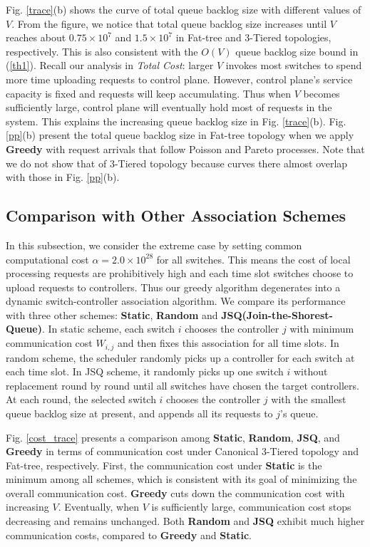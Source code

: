 \documentclass[10pt,journal,compsoc]{IEEEtran}
\begin{document}
Fig. \ref{trace}(b) shows the curve of total queue backlog size with different values of $V$. From the figure, we notice that total queue backlog size increases until $V$ reaches about $0.75 \times 10^7$ and $1.5 \times 10^7$ in Fat-tree and 3-Tiered topologies, respectively. This is also consistent with the $O(V)$ queue backlog size bound in (\ref{th1}). Recall our analysis in \emph{Total Cost}: larger $V$ invokes most switches to spend more time uploading requests to control plane. However, control plane's service capacity is fixed and requests will keep accumulating. Thus when $V$ becomes sufficiently large, control plane will eventually hold most of requests in the system. This explains the increasing queue backlog size in Fig. \ref{trace}(b). Fig. \ref{pp}(b) present the total queue backlog size in Fat-tree topology when we apply {\bf Greedy} with request arrivals that follow Poisson and Pareto processes. Note that we do not show that of 3-Tiered topology because curves there almost overlap with those in Fig. \ref{pp}(b).

\subsection{Comparison with Other Association Schemes}

In this subsection, we consider the extreme case by setting common computational cost $\alpha = 2.0 \times 10^{28}$ for all switches. This means the cost of local processing requests are prohibitively high and each time slot switches choose to upload requests to controllers. Thus our greedy algorithm degenerates into a dynamic switch-controller association algorithm. We compare its performance with three other schemes: \textbf{Static}, \textbf{Random} and \textbf{JSQ(Join-the-Shorest-Queue)}. In static scheme, each switch $i$ chooses the controller $j$ with minimum communication cost $W_{i,j}$ and then fixes this association for all time slots. In random scheme, the scheduler randomly picks up a controller for each switch at each time slot. In JSQ scheme, it randomly picks up one switch $i$ without replacement round by round until all switches have chosen the target controllers. At each round, the selected switch $i$ chooses the controller $j$ with the smallest queue backlog size at present, and appends all its requests to $j$'s queue. 

Fig. \ref{cost_trace} presents a comparison among \textbf{Static}, \textbf{Random}, \textbf{JSQ}, and \textbf{Greedy} in terms of communication cost under Canonical 3-Tiered topology and Fat-tree, respectively. First, the communication cost under \textbf{Static} is the minimum among all schemes, which is consistent with its goal of minimizing the overall communication cost. \textbf{Greedy} cuts down the communication cost with increasing $V$. Eventually, when $V$ is sufficiently large, communication cost stops decreasing and remains unchanged. Both \textbf{Random} and \textbf{JSQ} exhibit much higher communication costs, compared to \textbf{Greedy} and \textbf{Static}.
\end{document}
